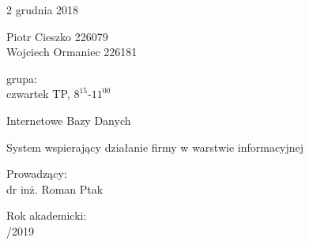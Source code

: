 \documentclass[12pt]{article}
\begin{document}
	
\thispagestyle{empty}

\begin{flushright}2 grudnia 2018\end{flushright}

\noindent
Piotr Cieszko 226079 \\
Wojciech Ormaniec 226181 \\

\vspace{1em}

\noindent
grupa: \\
czwartek TP, $8^{15}$-$11^{00}$

\vfill

\begin{center}
  \begin{Large}
Internetowe Bazy Danych
  \end{Large}

\vspace{2cm}
 

  \begin{Huge}
System wspierający działanie firmy w warstwie informacyjnej

  \end{Huge}
  
 \vspace{1cm}
  
  \begin{Large}



  \end{Large}
\end{center}

\vspace{3cm}
 
\noindent
  \begin{Large}
    Prowadzący: \\
      \vspace{.5cm}
\indent
dr inż. Roman Ptak 
  \end{Large}


  \vspace{1cm}
  
\noindent
  \begin{Large}
    Rok akademicki: \\
      \vspace{.5cm}
/2019
  \end{Large}
  

\vfill

\newpage

\tableofcontents
\end{document}
